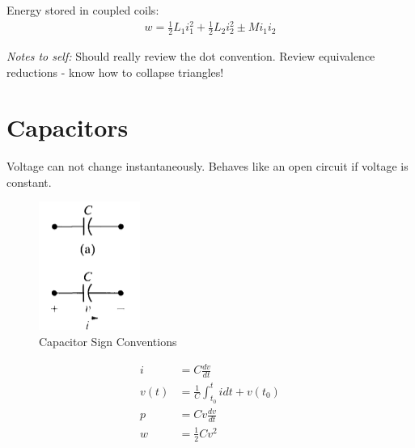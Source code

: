 \documentclass[a4paper,10pt]{report}
\begin{document}
Energy stored in coupled coils:
\begin{align*}
	w = \frac{1}{2}L_1i_1^2 + \frac{1}{2}L_2i_2^2 \pm Mi_1i_2
\end{align*}

\textit{Notes to self:}
Should really review the dot convention.
Review equivalence reductions - know how to collapse triangles!


\section{Capacitors}
Voltage can not change instantaneously.
Behaves like an open circuit if voltage is constant.
\begin{figure}[htpb]
	\begin{centering}
	\begin{center}
	\includegraphics{./capacitor_sign_convention.png}
	\caption{Capacitor Sign Conventions}
	\label{fig:capacitor_sign_convention}
	\end{center}
	\par\end{centering}
\end{figure}

\begin{align*}
	i &= C\frac{dv}{dt} \\
	v(t) &= \frac{1}{C}\int_{t_0}^t i dt + v(t_0) \\
	p &= Cv\frac{dv}{dt} \\
	w &= \frac{1}{2}Cv^2
\end{align*}
\end{document}
